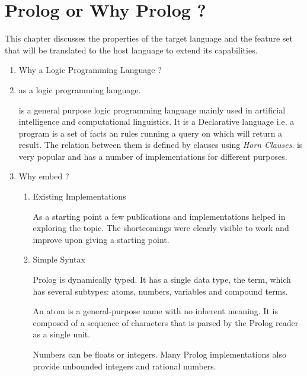\documentclass[thesis-solanki.tex]{subfiles}
\begin{document}
\chapter{Prolog or Why Prolog ?}\label{chap:pwp}

This chapter discusses the properties of the target language  and the feature set that will be translated to the host 
language to extend its capabilities.

\begin{enumerate}
\item Why a Logic Programming Language ?

\item {} as a logic programming language.

 is a general purpose logic programming language mainly used in artificial intelligence and computational linguistics.  
It is a Declarative language i.e. a program is a set of facts an rules running a query on which will return a result. The relation
between them is defined by clauses using \textit{Horn Clauses}\cite{wikiprolog}.  is very popular and has a number of 
implementations \cite{website:comparisonofprologimplementationswiki} for different purposes. 

\item Why embed  ?

\begin{enumerate}


\item Existing Implementations

As a starting point a few publications and implementations helped in exploring the topic. The shortcomings were clearly visible to work and
improve upon giving a starting point.

\item Simple Syntax
\cite{wikiprolog}

Prolog is dynamically typed. It has a single data type, the term, which has several subtypes: atoms, numbers, variables and compound terms.

An atom is a general-purpose name with no inherent meaning. It is composed of a sequence of characters that is parsed by the Prolog reader 
as a single unit.

Numbers can be floats or integers. Many Prolog implementations also provide unbounded integers and rational numbers.


\end{enumerate}
\end{enumerate}
\end{document}
